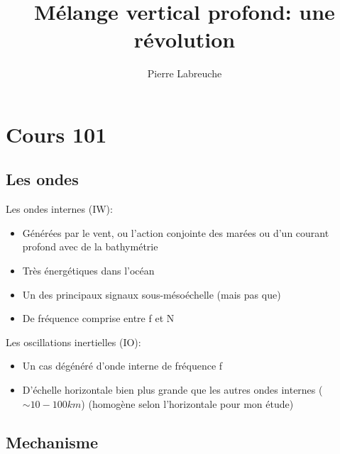 \documentclass{beamer}
\title[Réunion Modélisation]{Mélange vertical profond: une révolution}
\author[Pierre Labreuche]{Pierre Labreuche }%
\institute[LEGI:]{
   \'Equipes MEOM \& MEIGE
   \\LEGI}
\date[\today]{}%
\begin{document}
\frame
{
\titlepage

}

\section{Cours 101}

\subsection{Les ondes}

\frame
{
Les ondes internes (IW):
\begin{itemize}
\item<1-> Générées par le vent, ou l'action conjointe des marées ou d'un courant profond avec de la bathymétrie
\item<1-> Très énergétiques dans l'océan
\item<1-> Un des principaux signaux sous-mésoéchelle (mais pas que)
\item<1-> De fréquence comprise entre f et N
\begin{figure}[htbp]
\end{figure}
\end{itemize}
}

\frame
{
Les oscillations inertielles (IO):
\begin{itemize}
\item<1-> Un cas dégénéré d'onde interne de fréquence f
\item<1-> D'échelle horizontale bien plus grande que les autres ondes internes ($\sim 10 - 100 km$) (homogène selon l'horizontale pour mon étude)
\end{itemize}
}

\subsection{Mechanisme}
\frame
{
\begin{figure}[htbp]
\end{figure}
}
\end{document}
